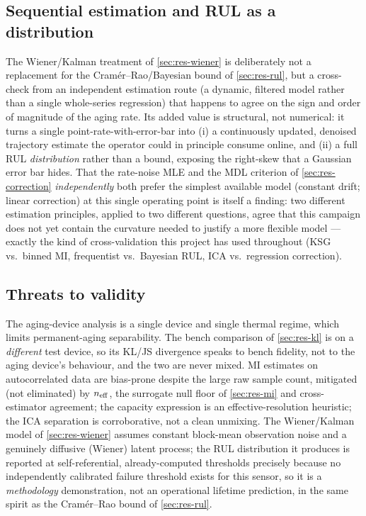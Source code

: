 \subsection{Sequential estimation and RUL as a distribution}
The Wiener/Kalman treatment of \cref{sec:res-wiener} is deliberately not a
replacement for the Cram\'er--Rao/Bayesian bound of \cref{sec:res-rul}, but a
cross-check from an independent estimation route (a dynamic, filtered model
rather than a single whole-series regression) that happens to agree on the
sign and order of magnitude of the aging rate. Its added value is
structural, not numerical: it turns a single point-rate-with-error-bar into
(i) a continuously updated, denoised trajectory estimate the operator could
in principle consume online, and (ii) a full RUL \emph{distribution} rather
than a bound, exposing the right-skew that a Gaussian error bar hides. That
the rate-noise MLE and the MDL criterion of \cref{sec:res-correction}
\emph{independently} both prefer the simplest available model (constant
drift; linear correction) at this single operating point is itself a
finding: two different estimation principles, applied to two different
questions, agree that this campaign does not yet contain the curvature
needed to justify a more flexible model --- exactly the kind of
cross-validation this project has used throughout (KSG vs.\ binned MI,
frequentist vs.\ Bayesian RUL, ICA vs.\ regression correction).

\subsection{Threats to validity}
The aging-device analysis is a single device and single thermal regime, which
limits permanent-aging separability. The bench comparison of \cref{sec:res-kl}
is on a \emph{different} test device, so its KL/JS divergence speaks to bench
fidelity, not to the aging device's behaviour, and the two are never mixed. MI
estimates on autocorrelated data are bias-prone despite the large raw sample
count, mitigated (not eliminated) by $n_{\mathrm{eff}}$, the surrogate null floor of
\cref{sec:res-mi} and cross-estimator agreement; the capacity expression is an
effective-resolution heuristic; the ICA separation is corroborative, not a clean
unmixing. The Wiener/Kalman model of \cref{sec:res-wiener} assumes constant
block-mean observation noise and a genuinely diffusive (Wiener) latent
process; the RUL distribution it produces is reported at self-referential,
already-computed thresholds precisely because no independently calibrated
failure threshold exists for this sensor, so it is a \emph{methodology}
demonstration, not an operational lifetime prediction, in the same spirit as
the Cram\'er--Rao bound of \cref{sec:res-rul}.
